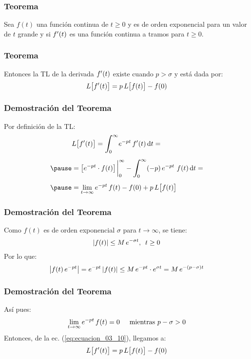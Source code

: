 \begin{frame}
\frametitle{Teorema}
Sea $f (t)$ una función continua de $t \geq 0$ y es de orden exponencial para un valor de $t$ grande y si ${f}^{\prime}(t)$ es una función continua a tramos para $t \geq 0$.
\end{frame}
\begin{frame}
\frametitle{Teorema}
Entonces la TL de la derivada ${f}^{\prime}(t)$ existe cuando $p > \sigma$ y está dada por:
\pause
\begin{align*}
L \big[  {f}^{\prime} (t)  \big] = p \, L \big[  f (t)  \big] - f(0)
\end{align*}
\end{frame}
\begin{frame}
\frametitle{Demostración del Teorema}
Por definición de la TL:
\pause
\begin{eqnarray}
\begin{aligned}[b]
&L \big[  \pderivada{f}(t) \big] = \scaleint{6ex}_{\bs 0}^{\infty} e^{-p t} \, \pderivada{f} (t) \dd{t} = \\[0.5em] \pause
&= \big[ e^{-p t} \cdot f (t) \big] \eval_{0}^{\infty} - \scaleint{6ex}_{\bs 0}^{\infty} (-p) \, e^{-p t} \ f (t) \dd{t} = \\[0.5em] \pause
&= \lim_{t \to \infty} e^{-p t} \, f (t) - f(0) + p \, L \big[ f (t) \big]
\end{aligned}
\label{eq:ecuacion_03_10}
\end{eqnarray}
\end{frame}
\begin{frame}
\frametitle{Demostración del Teorema}
Como $f (t)$ es de orden exponencial $\sigma$ para $t \to \infty$, se tiene:
\pause
\begin{align*}
\abs{f (t)} \leq M \, e^{-\sigma t}, \hspace{0.5em} t \geq 0
\end{align*}
\pause
Por lo que:
\pause
\begin{align*}
\abs{f (t) \, e^{-p t}} = e^{-p t} \, \abs{f (t)} \leq M \, e^{-p t} \cdot e^{\sigma t} = M \, e^{-(p - \sigma) t}
\end{align*}
\end{frame}
\begin{frame}
\frametitle{Demostración del Teorema}
Así pues:
\pause
\begin{align*}
\lim_{t \to \infty} e^{-p t} \, f (t) = 0 \hspace{0.5cm} \mbox{mientras  } p - \sigma > 0
\end{align*}
\pause
Entonces, de la ec. (\ref{eq:ecuacion_03_10}), llegamos a:
\pause
\begin{align}
L \big[  {f}^{\prime} (t)  \big] = p \, L \big[  f (t)  \big] - f (0)
\label{eq:ecuacion_03_11}
\end{align}
\end{frame}
